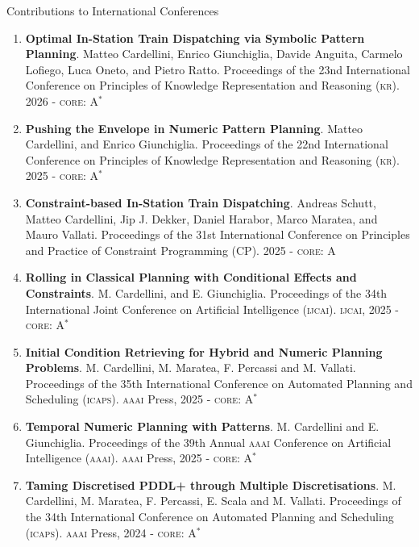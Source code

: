 \documentclass{resume} %
\begin{document}
\begin{rSection}{Contributions to International Conferences}
\begin{enumerate}[leftmargin=5mm]
	\item[C13] \textbf{Optimal In-Station Train Dispatching via Symbolic Pattern Planning}. Matteo Cardellini, Enrico Giunchiglia, Davide Anguita, Carmelo Lofiego, Luca Oneto, and Pietro Ratto. Proceedings of the 23nd International Conference on Principles of Knowledge Representation and Reasoning (\textsc{kr}). 2026 - \textsc{core}: A$^{*}$
	\item[C12] \textbf{Pushing the Envelope in Numeric Pattern Planning}. Matteo Cardellini, and Enrico Giunchiglia. Proceedings of the 22nd International Conference on Principles of Knowledge Representation and Reasoning (\textsc{kr}). 2025 - \textsc{core}: A$^{*}$
	
	
	\item[C11] \textbf{Constraint-based In-Station Train Dispatching}. Andreas Schutt, Matteo Cardellini, Jip J. Dekker, Daniel Harabor, Marco Maratea, and Mauro Vallati. Proceedings of the 31st International Conference on Principles and Practice of Constraint Programming (CP). 2025 - \textsc{core}: A
	
	
	\item[C10] \textbf{Rolling in Classical Planning with Conditional Effects and Constraints}. M. Cardellini, and E. Giunchiglia. Proceedings of the 34th International Joint Conference on Artificial Intelligence (\textsc{ijcai}). \textsc{ijcai}, 2025 - \textsc{core}: A$^{*}$
	
	\item[C9] \textbf{Initial Condition Retrieving for Hybrid and Numeric Planning Problems}. M. Cardellini, M. Maratea, F. Percassi and M. Vallati. Proceedings of the 35th International Conference on Automated Planning and Scheduling (\textsc{icaps}). \textsc{aaai} Press, 2025 - \textsc{core}: A$^{*}$
	
	
	\item[C8] \textbf{Temporal Numeric Planning with Patterns}. M. Cardellini and E. Giunchiglia. Proceedings of the 39th Annual \textsc{aaai} Conference on Artificial Intelligence (\textsc{aaai}). \textsc{aaai} Press, 2025 - \textsc{core}: A$^{*}$
	
	\item[C7] \textbf{Taming Discretised PDDL+ through Multiple Discretisations}. M. Cardellini, M. Maratea, F. Percassi, E. Scala and M. Vallati. Proceedings of the 34th International Conference on Automated Planning and Scheduling (\textsc{icaps}). \textsc{aaai} Press, 2024 - \textsc{core}: A$^{*}$
	

\end{enumerate}
\end{rSection}
\end{document}
